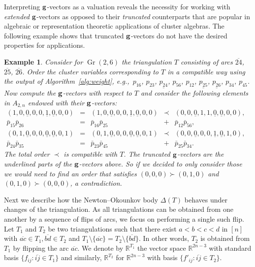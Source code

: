 \documentclass[10pt,a4paper]{amsart}
\newcommand{\thlabel}[1]{\label{#1}}
\newtheorem{Example}[Theorem]{Example}
\numberwithin{equation}{section}
\DeclareMathOperator{\Gr}{Gr}
\begin{document}
Interpreting ${\bf g}$-vectors as a valuation reveals the necessity for working with \emph{extended} ${\bf g}$-vectors as opposed to their \emph{truncated} counterparts that are popular in algebraic or representation theoretic applications of cluster algebras.
The following example shows that truncated ${\bf g}$-vectors do not have the desired properties for applications.

\begin{Example}\thlabel{exp:need ext gv}
Consider for $\Gr(2,6)$ the triangulation $T$ consisting of arcs $\overline{24}$, $\overline{25}$, $\overline{26}$.
Order the cluster variables corresponding to $T$ in a compatible way using the output of Algorithm~\ref{alg:weight}, e.g.,~$p_{16}$, $p_{23}$, $\underline{p_{24}}$, $p_{56}$, $p_{12}$, $\underline{p_{25}}$, $\underline{p_{26}}$, $p_{34}$, $p_{45}$.
Now compute the ${\bf g}$-vectors with respect to $T$ and consider the following elements in $A_{2,n}$ endowed with their ${\bf g}$-vectors:
\begin{displaymath}
\begin{matrix}
(1,0,\underline{0},0,0,\underline{1},\underline{0},0,0) &=& (1,0,\underline{0},0,0,\underline{1},\underline{0},0,0) &\prec&
(0,0,\underline{0},1,1,\underline{0},\underline{0},0,0),\\
 \bar p_{15}\bar p_{26} & = & \bar p_{16}\bar p_{25} & + & \bar p_{12}\bar p_{56},
&&&& \\[1ex]
(0,1,\underline{0},0,0,\underline{0},\underline{0},0,1) & = &
(0,1,\underline{0},0,0,\underline{0},\underline{0},0,1) &\prec& (0,0,\underline{0},0,0,\underline{1},\underline{0},1,0),\\
\bar p_{24}\bar p_{35} & = & \bar p_{23}\bar p_{45} & + & \bar p_{25}\bar p_{34}. %
\end{matrix}
\end{displaymath}
The total order $\prec$ is compatible with $T$.
The truncated ${\bf g}$-vectors are the underlined parts of the ${\bf g}$-vectors above. So if we decided to only consider those we would need to find an order that satisfies $(0,0,0)\succ (0,1,0)$ and $(0,1,0)\succ (0,0,0)$, a contradiction.
\end{Example}

Next we describe how the Newton--Okounkov body $\Delta(T)$ behaves under changes of the triangulation.
As all triangulations can be obtained from one another by a sequence of flips of arcs, we focus on performing a single such flip.
Let $T_1$ and $T_2$ be two triangulations such that there exist $a<b<c<d$ in $[n]$ with $\overline{ac}\in T_1, \overline{bd}\in T_2$ and $T_1\setminus \{\overline{ac}\}=T_2\setminus\{\overline{bd}\}$.
In other words, $T_2$ is obtained from $T_1$ by flipping the arc $\overline{ac}$.
We denote by $\mathbb R^{T_1}$ the vector space $\mathbb R^{2n-3}$ with standard basis $\{f_{ij}\colon \overline{ij}\in T_1\}$ and similarly, $\mathbb R^{T_2}$ for $\mathbb R^{2n-3}$ with basis $\{f'_{ij}\colon \overline{ij}\in T_2\}$.
\end{document}
